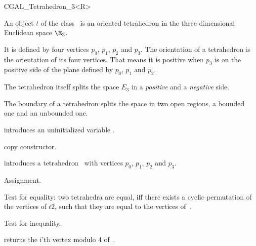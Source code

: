 

\begin {classtemplate} {CGAL_Tetrahedron_3<R>}

  An object $t$ of the class \classname\ is an oriented
tetrahedron in the three-dimensional Euclidean space $\E_3$. 

It is defined by four vertices $p_0$, $p_1$, $p_2$ and $p_3$.
The orientation of a tetrahedron is the orientation of its four 
vertices. That means it is positive when $p_3$ is on the positive
side of the plane defined by $p_0$, $p_1$ and $p_2$.

The tetrahedron itself splits the space $E_3$ in a {\em positive} and
a {\em negative} side.
 
The boundary of a tetrahedron splits the space in two open regions, a
bounded one and an unbounded one.

\creation
{}


\hidden {}
             {introduces an uninitialized variable \var.}

\hidden {}
 	    {copy constructor.}


\def\CCalternateThreeColumn{\CCtrue}
            {introduces a tetrahedron \var\ with vertices $p_0$, $p_1$, $p_2$ and $p_3$.}


\operations
\threecolumns{5cm}{4cm}

\hidden {}
        {Assignment.}

       {Test for equality: two tetrahedra are equal, iff there exists a 
        cyclic permutation of the vertices of $t2$, such that they are 
        equal to the vertices of~\var.}

       {Test for inequality.}

       {returns the i'th vertex modulo 4  of~\var.}


\end{classtemplate}
